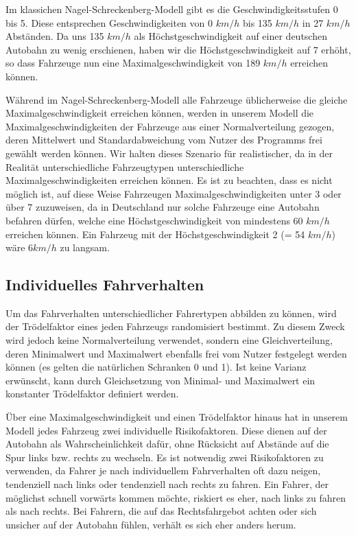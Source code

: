 \documentclass[10pt, a4paper]{article}
\newcommand\nsm{Nagel-Schreckenberg-Modell }
\begin{document}
Im klassichen \nsm gibt es die Geschwindigkeitsstufen 0 bis 5. Diese entsprechen Geschwindigkeiten von 0 $km/h$ bis 135 $km/h$ in 27 $km/h$ Abständen. Da uns 135 $km/h$ als Höchstgeschwindigkeit auf einer deutschen Autobahn zu wenig erschienen, haben wir die Höchstgeschwindigkeit auf 7 erhöht, so dass Fahrzeuge nun eine Maximalgeschwindigkeit von 189 $km/h$ erreichen können.

Während im \nsm alle Fahrzeuge üblicherweise die gleiche Maximalgeschwindigkeit erreichen können, werden in unserem Modell die Maximalgeschwindigkeiten der Fahrzeuge aus einer Normalverteilung gezogen, deren Mittelwert und Standardabweichung vom Nutzer des Programms frei gewählt werden können. Wir halten dieses Szenario für realistischer, da in der Realität unterschiedliche Fahrzeugtypen unterschiedliche Maximalgeschwindigkeiten erreichen können. Es ist zu beachten, dass es nicht möglich ist, auf diese Weise Fahrzeugen Maximalgeschwindigkeiten unter 3 oder über 7 zuzuweisen, da in Deutschland nur solche Fahrzeuge eine Autobahn befahren dürfen, welche eine Höchstgeschwindigkeit von mindestens 60 $km/h$ erreichen können. Ein Fahrzeug mit der Höchstgeschwindigkeit 2 (= 54 $km/h$) wäre $6km/h$ zu langsam.

\subsection{Individuelles Fahrverhalten}

Um das Fahrverhalten unterschiedlicher Fahrertypen abbilden zu können, wird der Trödelfaktor eines jeden Fahrzeugs randomisiert bestimmt. Zu diesem Zweck wird jedoch keine Normalverteilung verwendet, sondern eine Gleichverteilung, deren Minimalwert und Maximalwert ebenfalls frei vom Nutzer festgelegt werden können (es gelten die natürlichen Schranken 0 und 1). Ist keine Varianz erwünscht, kann durch Gleichsetzung von Minimal- und Maximalwert ein konstanter Trödelfaktor definiert werden.

Über eine Maximalgeschwindigkeit und einen Trödelfaktor hinaus hat in unserem Modell jedes Fahrzeug zwei individuelle Risikofaktoren. Diese dienen auf der Autobahn als Wahrscheinlichkeit dafür, ohne Rücksicht auf Abstände auf die Spur links bzw. rechts zu wechseln. Es ist notwendig zwei Risikofaktoren zu verwenden, da Fahrer je nach individuellem Fahrverhalten oft dazu neigen, tendenziell nach links oder tendenziell nach rechts zu fahren. Ein Fahrer, der möglichst schnell vorwärts kommen möchte, riskiert es eher, nach links zu fahren als nach rechts. Bei Fahrern, die auf das Rechtsfahrgebot achten oder sich unsicher auf der Autobahn fühlen, verhält es sich eher anders herum.
\end{document}
